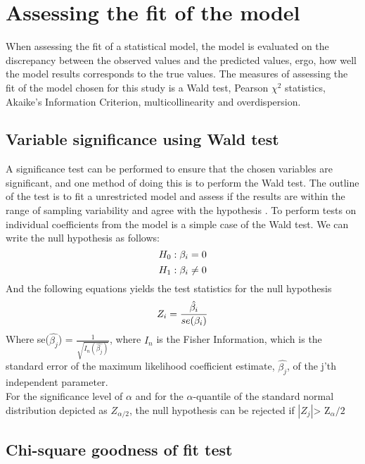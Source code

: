 \section{Assessing the fit of the model}
When assessing the fit of a statistical model, the model is evaluated on the discrepancy between the observed values and the predicted values, ergo, how well the model results corresponds to 
the true values. The measures of assessing the fit of the model chosen for this study is a Wald test, Pearson $\chi^{2}$ statistics, Akaike’s Information Criterion, multicollinearity and overdispersion.
\subsection{Variable significance using Wald test}
A significance test can be performed to ensure that the chosen variables are significant, and one
method of doing this is to perform the Wald test. The outline of the test is to fit a unrestricted
model and assess if the results are within the range of sampling variability and agree with the	hypothesis \cite{greene2012mastery}.
To perform tests on individual coefficients from the model is a simple case of the Wald test.
We can write the null hypothesis as follows: 
\begin{equation}
	\centering
	H_0:\beta_i =0 
\end{equation}
\begin{equation}
	\centering
	H_1:\beta_i\ne0 
\end{equation}
And the following equations yields the test statistics for the null hypothesis 
\begin{equation}
	\centering
	Z_i = \frac{\hat{\beta_i}}{se (\beta_i)}
\end{equation}
Where se($\hat{\beta_{j}}$) = $\frac{1}{\sqrt{I_{n}(\hat{\beta_{j}})}}$, where $I_{n}$ is the Fisher Information, which is the standard error of the maximum likelihood coefficient estimate, $\hat{\beta_{j}}$, of the j'th independent parameter.\\
For the significance level of $\alpha$ and for the $\alpha$-quantile of the standard normal distribution depicted as $Z_{\alpha/2}$, the null hypothesis can be rejected if $|Z_{j}|$> Z$_\alpha/2$
\subsection{Chi-square goodness of fit test} 

